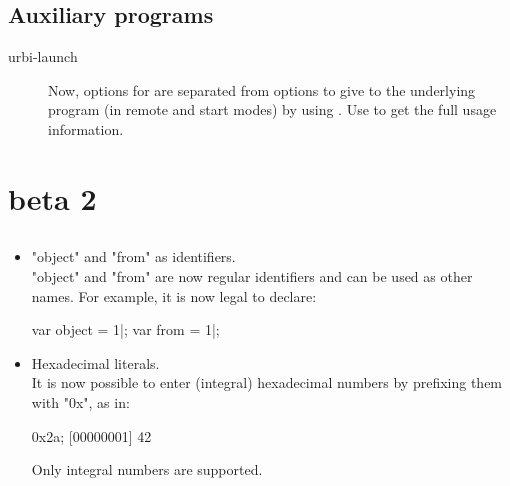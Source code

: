 \subsection{Auxiliary programs}

\begin{description}
\item[urbi-launch] Now, options for  are separated from
  options to give to the underlying program (in remote and start modes) by
  using \option{--}. Use  to get the full usage
  information.
\end{description}



\section{ beta 2}

\subsection{\us}

\begin{itemize}
\item "object" and "from" as identifiers.\\
  "object" and "from" are now regular identifiers and can be used as other
  names.  For example, it is now legal to declare:

\begin{urbiscript}
var object = 1|;
var from = 1|;
\end{urbiscript}

\item Hexadecimal literals.\\
  It is now possible to enter (integral) hexadecimal numbers by
  prefixing them with "0x", as in:

\begin{urbiscript}
0x2a;
[00000001] 42
\end{urbiscript}

  Only integral numbers are supported.

\end{itemize}

